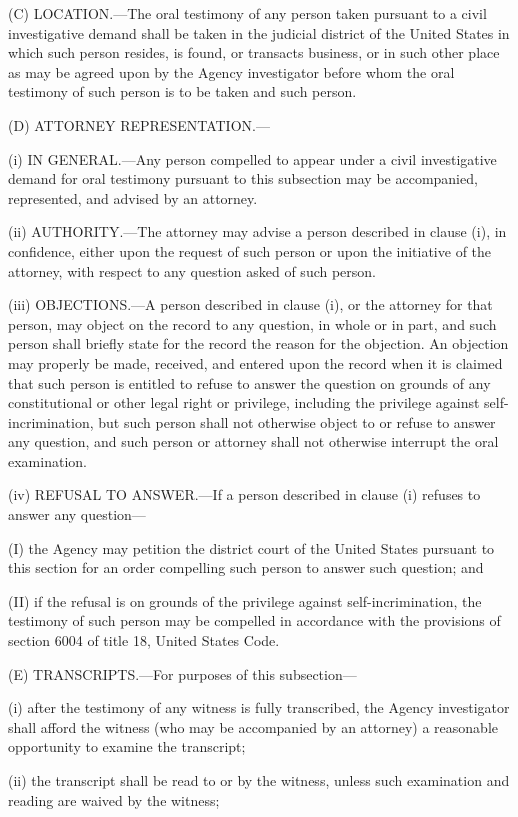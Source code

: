(C) LOCATION.—The oral testimony of any person taken pursuant to a civil investigative demand shall be taken in the judicial district of the United States in which such person resides, is found, or transacts business, or in such other place as may be agreed upon by the Agency investigator before whom the oral testimony of such person is to be taken and such person.

(D) ATTORNEY REPRESENTATION.—

(i) IN GENERAL.—Any person compelled to appear under a civil investigative demand for oral testimony pursuant to this subsection may be accompanied, represented, and advised by an attorney.

(ii) AUTHORITY.—The attorney may advise a person described in clause (i), in confidence, either upon the request of such person or upon the initiative of the attorney, with respect to any question asked of such person.

(iii) OBJECTIONS.—A person described in clause (i), or the attorney for that person, may object on the record to any question, in whole or in part, and such person shall briefly state for the record the reason for the objection. An objection may properly be made, received, and entered upon the record when it is claimed that such person is entitled to refuse to answer the question on grounds of any constitutional or other legal right or privilege, including the privilege against self-incrimination, but such person shall not otherwise object to or refuse to answer any question, and such person or attorney shall not otherwise interrupt the oral examination.

(iv) REFUSAL TO ANSWER.—If a person described in clause (i) refuses to answer any question—

(I) the Agency may petition the district court of the United States pursuant to this section for an order compelling such person to answer such question; and

(II) if the refusal is on grounds of the privilege against self-incrimination, the testimony of such person may be compelled in accordance with the provisions of section 6004 of title 18, United States Code.

(E) TRANSCRIPTS.—For purposes of this subsection—

(i) after the testimony of any witness is fully transcribed, the Agency investigator shall afford the witness (who may be accompanied by an attorney) a reasonable opportunity to examine the transcript;

(ii) the transcript shall be read to or by the witness, unless such examination and reading are waived by the witness;

